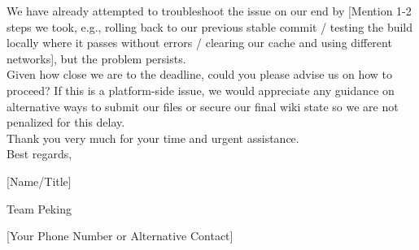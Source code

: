 \documentclass[12pt,a4paper]{article}
\begin{document}
\begin{enumerate}[parsep=0.5\baselineskip]
{\begin{minipage}{0.9\textwidth}
      We have already attempted to troubleshoot the issue on our end by [Mention 1-2 steps we took, e.g., rolling back to our previous stable commit / testing the build locally where it passes without errors / clearing our cache and using different networks], but the problem persists. \\
  
      Given how close we are to the deadline, could you please advise us on how to proceed? If this is a platform-side issue, we would appreciate any guidance on alternative ways to submit our files or secure our final wiki state so we are not penalized for this delay. \\
  
      Thank you very much for your time and urgent assistance.\\
  
      Best regards,
  
      [Name/Title]

      Team Peking

      [Your Phone Number or Alternative Contact]
    \end{minipage}
  }
\end{enumerate}
\end{document}
